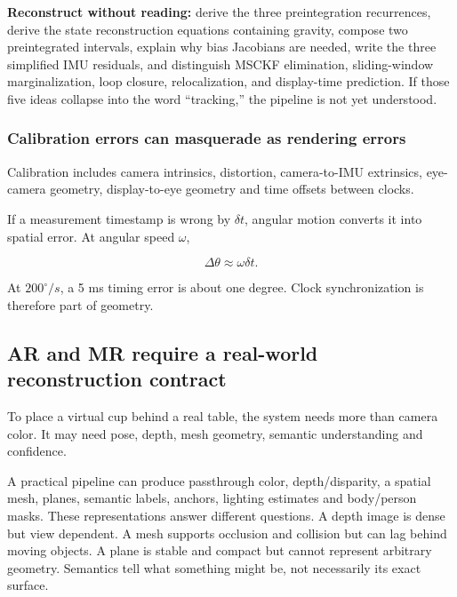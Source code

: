 \textbf{Reconstruct without reading:} derive the three preintegration recurrences, derive the state reconstruction equations containing gravity, compose two preintegrated intervals, explain why bias Jacobians are needed, write the three simplified IMU residuals, and distinguish MSCKF elimination, sliding-window marginalization, loop closure, relocalization, and display-time prediction. If those five ideas collapse into the word ``tracking,'' the pipeline is not yet understood.

\subsubsection{Calibration errors can masquerade as rendering errors}\label{04-visual-computing-ii-ch035-calibration-errors-can-masquerade-as-rendering-errors}

\hypertarget{04-visual-computing-ii-ch035-calibration-errors-can-masquerade-as-rendering-errors}{}

Calibration includes camera intrinsics, distortion, camera-to-IMU extrinsics, eye-camera geometry, display-to-eye geometry and time offsets between clocks.

If a measurement timestamp is wrong by \(\delta t\), angular motion converts it into spatial error. At angular speed \(\omega\),

\[
\Delta\theta\approx \omega\delta t.
\]

At \(200^\circ/s\), a 5 ms timing error is about one degree. Clock synchronization is therefore part of geometry.

\subsection{AR and MR require a real-world reconstruction contract}\label{04-visual-computing-ii-ch035-ar-and-mr-require-a-real-world-reconstruction-contract}

\hypertarget{04-visual-computing-ii-ch035-ar-and-mr-require-a-real-world-reconstruction-contract}{}

To place a virtual cup behind a real table, the system needs more than camera color. It may need pose, depth, mesh geometry, semantic understanding and confidence.

A practical pipeline can produce passthrough color, depth/disparity, a spatial mesh, planes, semantic labels, anchors, lighting estimates and body/person masks. These representations answer different questions. A depth image is dense but view dependent. A mesh supports occlusion and collision but can lag behind moving objects. A plane is stable and compact but cannot represent arbitrary geometry. Semantics tell what something might be, not necessarily its exact surface.

